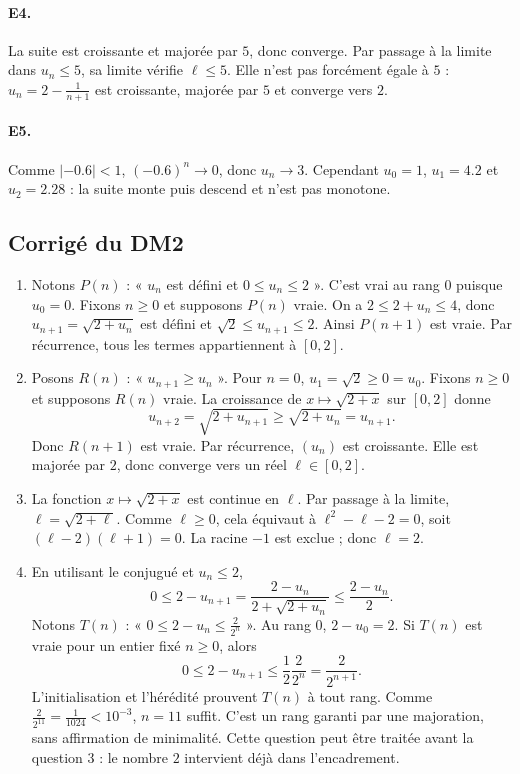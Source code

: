 \paragraph{E4.}La suite est croissante et majorée par $5$, donc converge. Par passage à la limite dans $u_n\le5$, sa limite vérifie $\ell\le5$. Elle n'est pas forcément égale à $5$ : $u_n=2-\frac{1}{n+1}$ est croissante, majorée par $5$ et converge vers $2$.

\paragraph{E5.}Comme $|-\num{0,6}|<1$, $(-\num{0,6})^n\to0$, donc $u_n\to3$. Cependant $u_0=1$, $u_1=\num{4,2}$ et $u_2=\num{2,28}$ : la suite monte puis descend et n'est pas monotone.

\subsection{Corrigé du DM2}\begin{enumerate}
\item Notons $P(n)$ : « $u_n$ est défini et $0\le u_n\le2$ ». C'est vrai au rang $0$ puisque $u_0=0$. Fixons $n\ge0$ et supposons $P(n)$ vraie. On a $2\le2+u_n\le4$, donc $u_{n+1}=\sqrt{2+u_n}$ est défini et $\sqrt2\le u_{n+1}\le2$. Ainsi $P(n+1)$ est vraie. Par récurrence, tous les termes appartiennent à $[0,2]$.
\item Posons $R(n)$ : « $u_{n+1}\ge u_n$ ». Pour $n=0$, $u_1=\sqrt2\ge0=u_0$. Fixons $n\ge0$ et supposons $R(n)$ vraie. La croissance de $x\mapsto\sqrt{2+x}$ sur $[0,2]$ donne
\[u_{n+2}=\sqrt{2+u_{n+1}}\ge\sqrt{2+u_n}=u_{n+1}.\]
Donc $R(n+1)$ est vraie. Par récurrence, $(u_n)$ est croissante. Elle est majorée par $2$, donc converge vers un réel $\ell\in[0,2]$.
\item La fonction $x\mapsto\sqrt{2+x}$ est continue en $\ell$. Par passage à la limite, $\ell=\sqrt{2+\ell}$. Comme $\ell\ge0$, cela équivaut à $\ell^2-\ell-2=0$, soit $(\ell-2)(\ell+1)=0$. La racine $-1$ est exclue ; donc $\ell=2$.
\item En utilisant le conjugué et $u_n\le2$,
\[0\le2-u_{n+1}=\frac{2-u_n}{2+\sqrt{2+u_n}}\le\frac{2-u_n}{2}.\]
Notons $T(n)$ : « $0\le2-u_n\le\frac{2}{2^n}$ ». Au rang $0$, $2-u_0=2$. Si $T(n)$ est vraie pour un entier fixé $n\ge0$, alors
\[0\le2-u_{n+1}\le\frac12\frac2{2^n}=\frac2{2^{n+1}}.\]
L'initialisation et l'hérédité prouvent $T(n)$ à tout rang. Comme $\frac{2}{2^{11}}=\frac{1}{1024}<10^{-3}$, $n=11$ suffit. C'est un rang garanti par une majoration, sans affirmation de minimalité. Cette question peut être traitée avant la question 3 : le nombre $2$ intervient déjà dans l'encadrement.
\end{enumerate}

